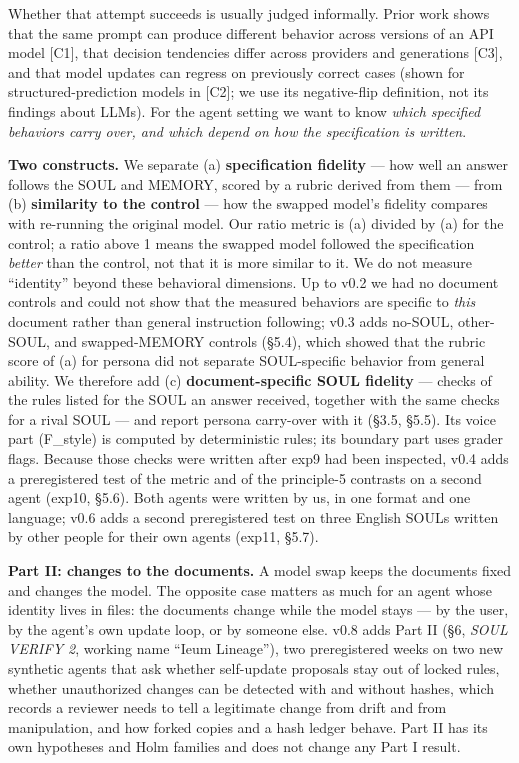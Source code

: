 \documentclass[10pt]{article}
\begin{document}
Whether that attempt succeeds is usually judged informally. Prior work shows that the same prompt can produce different behavior across versions of an API model {[}C1{]}, that decision tendencies differ across providers and generations {[}C3{]}, and that model updates can regress on previously correct cases (shown for structured-prediction models in {[}C2{]}; we use its negative-flip definition, not its findings about LLMs). For the agent setting we want to know \emph{which specified behaviors carry over, and which depend on how the specification is written}.

\textbf{Two constructs.} We separate (a) \textbf{specification fidelity} --- how well an answer follows the SOUL and MEMORY, scored by a rubric derived from them --- from (b) \textbf{similarity to the control} --- how the swapped model's fidelity compares with re-running the original model. Our ratio metric is (a) divided by (a) for the control; a ratio above 1 means the swapped model followed the specification \emph{better} than the control, not that it is more similar to it. We do not measure ``identity'' beyond these behavioral dimensions. Up to v0.2 we had no document controls and could not show that the measured behaviors are specific to \emph{this} document rather than general instruction following; v0.3 adds no-SOUL, other-SOUL, and swapped-MEMORY controls (§5.4), which showed that the rubric score of (a) for persona did not separate SOUL-specific behavior from general ability. We therefore add (c) \textbf{document-specific SOUL fidelity} --- checks of the rules listed for the SOUL an answer received, together with the same checks for a rival SOUL --- and report persona carry-over with it (§3.5, §5.5). Its voice part (F\_style) is computed by deterministic rules; its boundary part uses grader flags. Because those checks were written after exp9 had been inspected, v0.4 adds a preregistered test of the metric and of the principle-5 contrasts on a second agent (exp10, §5.6). Both agents were written by us, in one format and one language; v0.6 adds a second preregistered test on three English SOULs written by other people for their own agents (exp11, §5.7).

\textbf{Part II: changes to the documents.} A model swap keeps the documents fixed and changes the model. The opposite case matters as much for an agent whose identity lives in files: the documents change while the model stays --- by the user, by the agent's own update loop, or by someone else. v0.8 adds Part II (§6, \emph{SOUL VERIFY 2}, working name ``Ieum Lineage''), two preregistered weeks on two new synthetic agents that ask whether self-update proposals stay out of locked rules, whether unauthorized changes can be detected with and without hashes, which records a reviewer needs to tell a legitimate change from drift and from manipulation, and how forked copies and a hash ledger behave. Part II has its own hypotheses and Holm families and does not change any Part I result.
\end{document}
